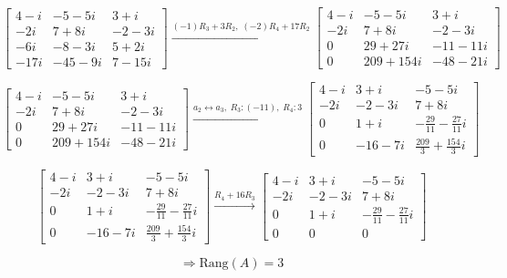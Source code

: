 \documentclass{article}
\begin{document}
\[
\begin{bmatrix}
4-i & -5-5i & 3+i\\
-2i & 7+8i & -2-3i\\
-6i & -8-3i & 5+2i\\
-17i & -45-9i & 7-15i
\end{bmatrix}
\xrightarrow{(-1)R_3 + 3R_2,\; (-2)R_4 + 17R_2}
\begin{bmatrix}
4-i & -5-5i & 3+i\\
-2i & 7+8i & -2-3i\\
0 & 29+27i & -11-11i\\
0 & 209+154i & -48-21i
\end{bmatrix}
\]

\[
\begin{bmatrix}
4-i & -5-5i & 3+i\\
-2i & 7+8i & -2-3i\\
0 & 29+27i & -11-11i\\
0 & 209+154i & -48-21i
\end{bmatrix}
\xrightarrow{a_2 \leftrightarrow a_3,\; R_3 : (-11),\; R_4 : 3}
\begin{bmatrix}
4-i & 3+i & -5-5i\\
-2i & -2-3i & 7+8i\\
0 & 1+i & -\tfrac{29}{11}-\tfrac{27}{11}i\\
0 & -16-7i & \tfrac{209}{3}+\tfrac{154}{3}i
\end{bmatrix}
\]

\[
\begin{bmatrix}
4-i & 3+i & -5-5i\\
-2i & -2-3i & 7+8i\\
0 & 1+i & -\tfrac{29}{11}-\tfrac{27}{11}i\\
0 & -16-7i & \tfrac{209}{3}+\tfrac{154}{3}i
\end{bmatrix}
\xrightarrow{R_4 + 16R_3}
\begin{bmatrix}
4-i & 3+i & -5-5i\\
-2i & -2-3i & 7+8i\\
0 & 1+i & -\tfrac{29}{11}-\tfrac{27}{11}i\\
0 & 0 & 0
\end{bmatrix}
\]

\[
\Rightarrow \text{Rang}(A) = 3
\]

\end{document}
